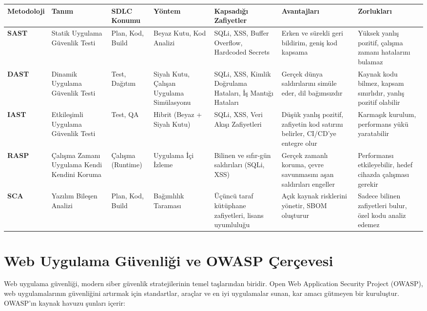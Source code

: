 \begin{adjustbox}{max width=\textwidth}
\begin{tabularx}{\textwidth}{|l|X|l|l|X|X|X|}
\hline
\textbf{Metodoloji} & \textbf{Tanım} & \textbf{SDLC Konumu} & \textbf{Yöntem} & \textbf{Kapsadığı Zafiyetler} & \textbf{Avantajları} & \textbf{Zorlukları} \\
\hline
\textbf{SAST} & Statik Uygulama Güvenlik Testi & Plan, Kod, Build & Beyaz Kutu, Kod Analizi & SQLi, XSS, Buffer Overflow, Hardcoded Secrets & Erken ve sürekli geri bildirim, geniş kod kapsama & Yüksek yanlış pozitif, çalışma zamanı hatalarını bulamaz \\
\hline
\textbf{DAST} & Dinamik Uygulama Güvenlik Testi & Test, Dağıtım & Siyah Kutu, Çalışan Uygulama Simülasyonu & SQLi, XSS, Kimlik Doğrulama Hataları, İş Mantığı Hataları & Gerçek dünya saldırılarını simüle eder, dil bağımsızdır & Kaynak kodu bilmez, kapsam sınırlıdır, yanlış pozitif olabilir \\
\hline
\textbf{IAST} & Etkileşimli Uygulama Güvenlik Testi & Test, QA & Hibrit (Beyaz + Siyah Kutu) & SQLi, XSS, Veri Akışı Zafiyetleri & Düşük yanlış pozitif, zafiyetin kod satırını belirler, CI/CD'ye entegre olur & Karmaşık kurulum, performans yükü yaratabilir \\
\hline
\textbf{RASP} & Çalışma Zamanı Uygulama Kendi Kendini Koruma & Çalışma (Runtime) & Uygulama İçi İzleme & Bilinen ve sıfır-gün saldırıları (SQLi, XSS) & Gerçek zamanlı koruma, çevre savunmasını aşan saldırıları engeller & Performansı etkileyebilir, hedef cihazda çalışması gerekir \\
\hline
\textbf{SCA} & Yazılım Bileşen Analizi & Plan, Kod, Build & Bağımlılık Taraması & Üçüncü taraf kütüphane zafiyetleri, lisans uyumluluğu & Açık kaynak risklerini yönetir, SBOM oluşturur & Sadece bilinen zafiyetleri bulur, özel kodu analiz edemez \\
\hline
\end{tabularx}
\end{adjustbox}

\section{Web Uygulama Güvenliği ve OWASP Çerçevesi}

Web uygulama güvenliği, modern siber güvenlik stratejilerinin temel taşlarından biridir. Open Web Application Security Project (OWASP), web uygulamalarının güvenliğini artırmak için standartlar, araçlar ve en iyi uygulamalar sunan, kar amacı gütmeyen bir kuruluştur. OWASP'ın kaynak havuzu şunları içerir:

